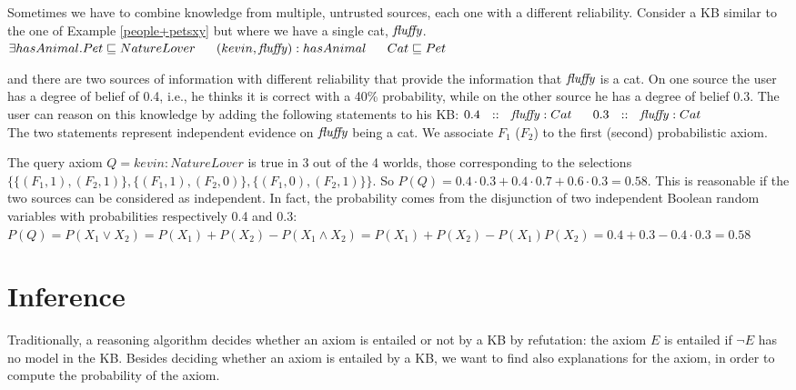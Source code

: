 \begin{example}
	\label{people+pets_comb}
	\begin{small}
		Sometimes we have to combine knowledge from multiple, untrusted sources, each one with a different reliability. 
		Consider a KB similar to the one of Example \ref{people+petsxy} but where we have a single cat, ${\mathit{fluffy}}$.
		{\center $\exists hasAnimal.Pet \sqsubseteq NatureLover\ \ \ \ \ (kevin,\fluffy):hasAnimal\ \ \ \ \ Cat\sqsubseteq Pet$\\}
		
		\noindent and there are two sources of information with different reliability that provide the information that ${\mathit{fluffy}}$ is a cat. 
		On one source the user has a degree of belief of 0.4, i.e., he thinks it is correct with a 40\% probability,  
		while on the other source he has a degree of belief 0.3. %
		The user can reason on this knowledge by adding the following statements to his KB:
		{\center$0.4\ \ ::\ \ \fluffy: Cat\ \ \ \ \ 0.3\ \ ::\ \ \fluffy: Cat$\\}
		The two statements represent independent evidence on ${\mathit{fluffy}}$ being a cat. We associate $F_1$ ($F_2$) to the first (second) probabilistic axiom.
		
		The query axiom $Q=kevin:NatureLover$ is true in 3 out of the 4 worlds, those corresponding to the selections 
		$
		\{ \{(F_1,1),(F_2,1)\},
		\{(F_1,1),(F_2,0)\},
		\{(F_1,0),(F_2,1)\}\}
		$. 
		So 
		$P(Q)=0.4\cdot 0.3+0.4\cdot 0.7+ 0.6\cdot 0.3=0.58.$
		This is reasonable if the two sources can be considered as independent. In fact,  the probability comes from the  disjunction of two
		independent Boolean random variables with probabilities respectively 0.4 and 0.3: 
		$
		P(Q) = P(X_1\vee X_2) = P(X_1)+P(X_2)-P(X_1\wedge X_2)
		= P(X_1)+P(X_2)-P(X_1)P(X_2)
		= 0.4+0.3-0.4\cdot 0.3=0.58
		$
	\end{small}
\end{example}

\section{Inference}
\label{app:inf}
Traditionally, a reasoning algorithm decides  whether an axiom is entailed or not by a KB by refutation: the  axiom $E$ is entailed if $\neg E$ has no model
in the KB.
Besides deciding whether an axiom is entailed by a KB, we want to find also explanations for the axiom, in order to compute the probability of the axiom.

